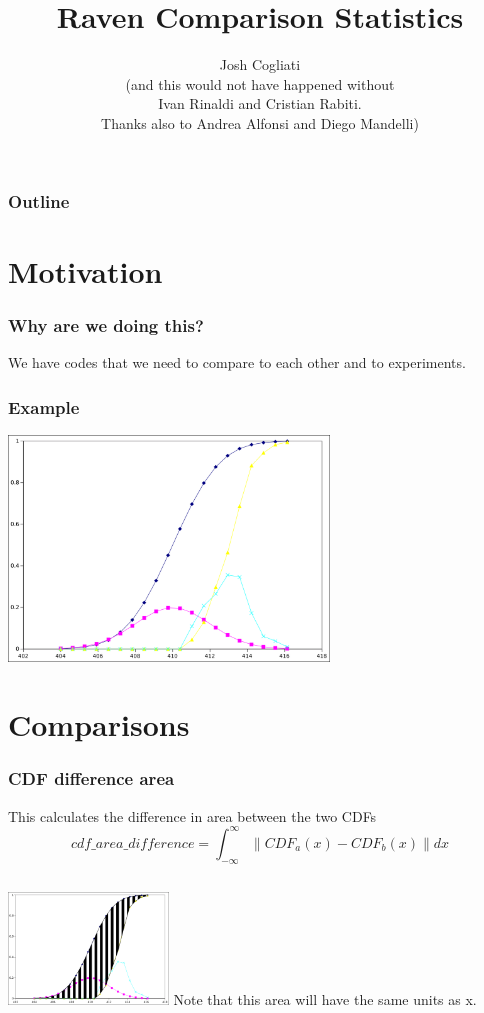 \documentclass{beamer}
\title{Raven Comparison Statistics}
\author{Josh Cogliati\\ (and this would not have happened without\\ Ivan Rinaldi and Cristian Rabiti.  \\Thanks also to Andrea Alfonsi and Diego Mandelli)}
\begin{document}
\begin{frame}
  \titlepage
\end{frame}

\begin{frame}
  \frametitle{Outline}
  \tableofcontents
\end{frame}

\section{Motivation}

\begin{frame}
  \frametitle{Why are we doing this?}
  We have codes that we need to compare to each other and to experiments.
\end{frame}

\begin{frame}
  \frametitle{Example}
  \includegraphics[height=6cm]{example}
\end{frame}

\section{Comparisons}

\begin{frame}
  \frametitle{CDF difference area}
  This calculates the difference in area between the two CDFs
  \begin{equation}
    cdf\_area\_difference = \int_{-\infty}^{\infty}{\|CDF_a(x)-CDF_b(x)\|dx}
  \end{equation}
  \begin{columns}
    \includegraphics[height=3cm]{example_cdf_area}
    Note that this area will have the same units as x.
  \end{columns}
\end{frame}
\end{document}
